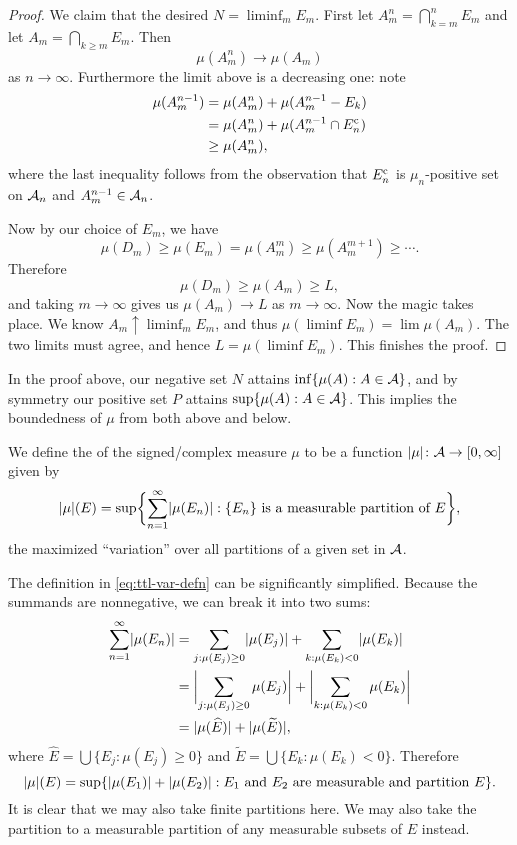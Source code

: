 \begin{proof}
    We claim that the desired $N = \liminf_m E_m$. First let $A_m^n=\bigcap_{k=m}^n E_m$ and let $A_m = \bigcap_{k\geq m}E_m$. Then  \[\mu(A_m^n)\to \mu(A_m)\] as $n\to \infty$. Furthermore the limit above is a decreasing one: note \begin{align*}
        \mu(A_m^{n-1}) & = \mu(A_m^n) + \mu(A_m^{n-1} - E_k) \\
        & = \mu(A_m^n) + \mu(A_m^{n-1}\cap E_n^{\mathrm{c}}) \\
        & \geq \mu(A_m^n), 
    \end{align*}
    where the last inequality follows from the observation that $E_n^{\mathrm{c}}$ is $\mu_n$-positive set on $\mathcal{A}_n$ and $A_m^{n-1} \in \mathcal{A}_n$.

    Now by our choice of $E_m$, we have \[
        \mu(D_m) \geq \mu(E_m) = \mu(A_m^m)\geq \mu(A_m^{m+1}) \geq \dotsb.
    \] Therefore \[\mu(D_m) \geq \mu(A_m) \geq L,\] and taking $m \to \infty$ gives us $\mu(A_m) \to L$ as $m\to \infty$. Now the magic takes place. We know $A_m \uparrow \liminf_m E_m$, and thus $\mu(\liminf E_m) = \lim \mu(A_m)$. The two limits must agree, and hence $L = \mu(\liminf E_m)$. This finishes the proof. 
\end{proof}

In the proof above, our negative set $N$ attains $\inf\{\mu(A):A\in \mathcal{A}\}$, and by symmetry our positive set $P$ attains $\sup\{\mu(A):A\in \mathcal{A}\}$. This implies the boundedness of $\mu$ from both above and below.

We define the  of the signed/complex measure $\mu$ to be a function $\lvert \mu \rvert\colon \mathcal{A} \to [0,\infty]$ given by \begin{equation} \label{eq:ttl-var-defn}
    \abs{\mu}(E) = \sup\biggl\{\sum_{n=1}^\infty \abs{\mu(E_n)} : \{E_n\}\text{ is a measurable partition of } E\biggr\},
\end{equation}
the maximized ``variation'' over all partitions of a given set in $\mathcal{A}$.

The definition in \eqref{eq:ttl-var-defn} can be significantly simplified. Because the summands are nonnegative, we can break it into two sums: \begin{align*}
    \sum_{n=1}^\infty \lvert \mu(E_n) \rvert & = \sum_{j:\mu(E_j) \geq 0} \lvert \mu(E_j) \rvert + \sum_{k:\mu(E_k) < 0} \lvert \mu(E_k) \rvert \\
    & = \biggl\vert\sum_{j:\mu(E_j) \geq 0} \mu(E_j)\biggr\vert + \biggl\vert\sum_{k:\mu(E_k)<0} \mu(E_k)\biggr\vert \\ & = 
    \lvert \mu(\widehat{E}) \rvert + \lvert \mu(\widetilde{E}) \rvert,
\end{align*}
where $\widehat{E} = \bigcup\{E_j : \mu(E_j) \geq 0\}$ and $\widetilde{E} = \bigcup\{E_k : \mu(E_k) < 0\}$.
Therefore \begin{equation} \label{eq:ttl-var-equiv}
    \abs{\mu}(E) = \sup\{ \abs{\mu(E_1)} + \abs{\mu(E_2)} : E_1\text{ and } E_2 \text{ are measurable and partition } E\}.
\end{equation} It is clear that we may also take finite partitions here. We may also take the partition to a measurable partition of any measurable subsets of $E$ instead.

